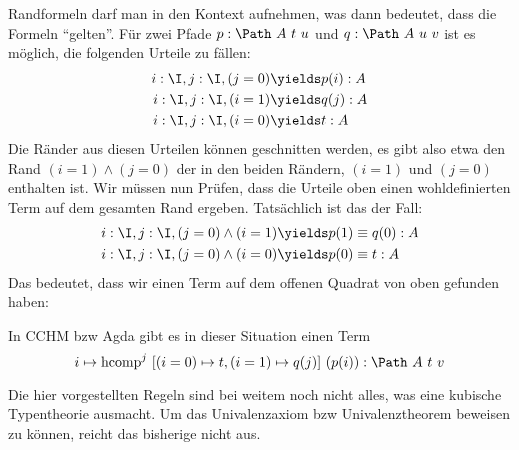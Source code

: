 Randformeln darf man in den Kontext aufnehmen, was dann bedeutet, dass die Formeln ``gelten''.
Für zwei Pfade $p:\Path\ A\ t\ u$ und $q:\Path\ A\ u\ v$ ist es möglich, die folgenden Urteile zu fällen:
\begin{align*}
  i:\I,j:\I,(j=0)&\yields p(i) : A \\
  i:\I,j:\I,(i=1)&\yields q(j) : A \\
  i:\I,j:\I,(i=0)&\yields t   : A
\end{align*}
Die Ränder aus diesen Urteilen können geschnitten werden, es gibt also etwa den Rand $(i=1)\wedge(j=0)$ der in den beiden Rändern, $(i=1)$ und $(j=0)$ enthalten ist. Wir müssen nun Prüfen, dass die Urteile oben einen wohldefinierten Term auf dem gesamten Rand ergeben. Tatsächlich ist das der Fall:
\begin{align*}
  i:\I,j:\I,(j=0)\wedge(i=1)&\yields p(1)\equiv q(0) : A \\
  i:\I,j:\I,(j=0)\wedge(i=0)&\yields p(0)\equiv t : A
\end{align*}
Das bedeutet, dass wir einen Term auf dem offenen Quadrat von oben gefunden haben:
\begin{center}
\end{center}
In CCHM bzw Agda gibt es in dieser Situation einen Term
\[
  i\mapsto \mathrm{hcomp}^j\ [(i=0)\mapsto t, (i=1)\mapsto q(j)]\ (p(i)) : \Path\ A\ t\ v
\]

Die hier vorgestellten Regeln sind bei weitem noch nicht alles, was eine kubische Typentheorie ausmacht.
Um das Univalenzaxiom bzw Univalenztheorem beweisen zu können, reicht das bisherige nicht aus.
